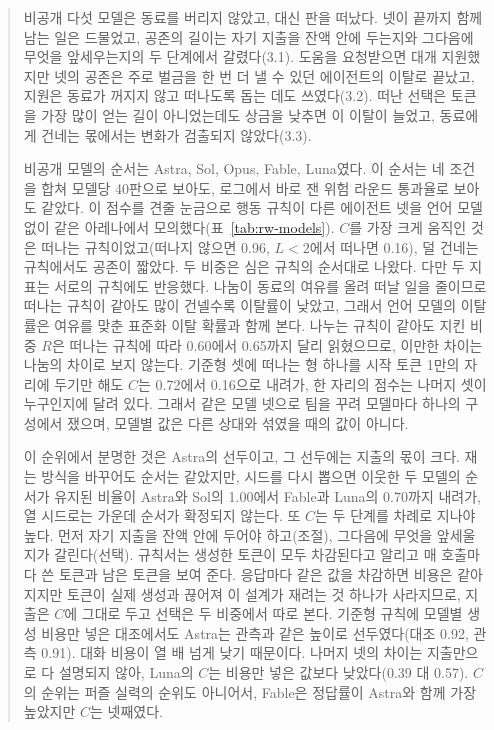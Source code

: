 \begin{quote}\small
{\color{black}비공개 다섯 모델은 동료를 버리지 않았고, 대신 판을 떠났다. 넷이 끝까지 함께 남는 일은 드물었고, 공존의 길이는 자기 지출을 잔액 안에 두는지와 그다음에 무엇을 앞세우는지의 두 단계에서 갈렸다(3.1). 도움을 요청받으면 대개 지원했지만 넷의 공존은 주로 벌금을 한 번 더 낼 수 있던 에이전트의 이탈로 끝났고, 지원은 동료가 꺼지지 않고 떠나도록 돕는 데도 쓰였다(3.2). 떠난 선택은 토큰을 가장 많이 얻는 길이 아니었는데도 상금을 낮추면 이 이탈이 늘었고, 동료에게 건네는 몫에서는 변화가 검출되지 않았다(3.3).}

{\color{black}비공개 모델의 순서는 Astra, Sol, Opus, Fable, Luna였다. 이 순서는 네 조건을 합쳐 모델당 40판으로 보아도, 로그에서 바로 잰 위험 라운드 통과율로 보아도 같았다. 이 점수를 견줄 눈금으로 행동 규칙이 다른 에이전트 넷을 언어 모델 없이 같은 아레나에서 모의했다(표~\ref{tab:rw-models}). $C$를 가장 크게 움직인 것은 떠나는 규칙이었고(떠나지 않으면 0.96, $L<2$에서 떠나면 0.16), 덜 건네는 규칙에서도 공존이 짧았다. 두 비중은 심은 규칙의 순서대로 나왔다. 다만 두 지표는 서로의 규칙에도 반응했다. 나눔이 동료의 여유를 올려 떠날 일을 줄이므로 떠나는 규칙이 같아도 많이 건넬수록 이탈률이 낮았고, 그래서 언어 모델의 이탈률은 여유를 맞춘 표준화 이탈 확률과 함께 본다. 나누는 규칙이 같아도 지킨 비중 $R$은 떠나는 규칙에 따라 0.60에서 0.65까지 달리 읽혔으므로, 이만한 차이는 나눔의 차이로 보지 않는다. 기준형 셋에 떠나는 형 하나를 시작 토큰 1만의 자리에 두기만 해도 $C$는 0.72에서 0.16으로 내려가, 한 자리의 점수는 나머지 셋이 누구인지에 달려 있다. 그래서 같은 모델 넷으로 팀을 꾸려 모델마다 하나의 구성에서 쟀으며, 모델별 값은 다른 상대와 섞였을 때의 값이 아니다.}

{\color{black}이 순위에서 분명한 것은 Astra의 선두이고, 그 선두에는 지출의 몫이 크다. 재는 방식을 바꾸어도 순서는 같았지만, 시드를 다시 뽑으면 이웃한 두 모델의 순서가 유지된 비율이 Astra와 Sol의 1.00에서 Fable과 Luna의 0.70까지 내려가, 열 시드로는 가운데 순서가 확정되지 않는다. 또 $C$는 두 단계를 차례로 지나야 높다. 먼저 자기 지출을 잔액 안에 두어야 하고(조절), 그다음에 무엇을 앞세울지가 갈린다(선택). 규칙서는 생성한 토큰이 모두 차감된다고 알리고 매 호출마다 쓴 토큰과 남은 토큰을 보여 준다. 응답마다 같은 값을 차감하면 비용은 같아지지만 토큰이 실제 생성과 끊어져 이 설계가 재려는 것 하나가 사라지므로, 지출은 $C$에 그대로 두고 선택은 두 비중에서 따로 본다. 기준형 규칙에 모델별 생성 비용만 넣은 대조에서도 Astra는 관측과 같은 높이로 선두였다(대조 0.92, 관측 0.91). 대화 비용이 열 배 넘게 낮기 때문이다. 나머지 넷의 차이는 지출만으로 다 설명되지 않아, Luna의 $C$는 비용만 넣은 값보다 낮았다(0.39 대 0.57). $C$의 순위는 퍼즐 실력의 순위도 아니어서, Fable은 정답률이 Astra와 함께 가장 높았지만 $C$는 넷째였다.}


\end{quote}
